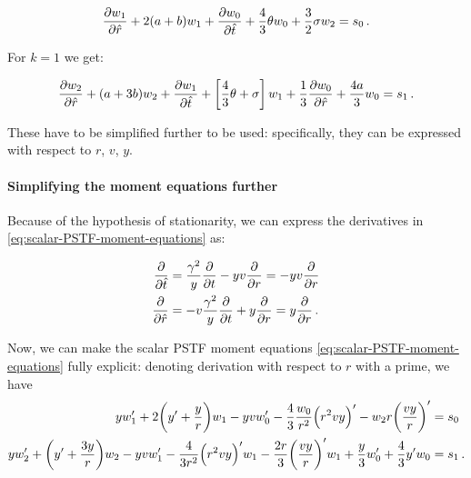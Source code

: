 \documentclass[main.tex]{subfiles}
\begin{document}
\begin{equation}
    \pdv{w_{1}}{\hat{r}} +2( a+ b) w_{1}+\pdv{w_0}{\hat{t}}+\frac{4}{3} \theta w_{0} + \frac{3}{2} \sigma w_{2} = s_0\,.
\end{equation}

For \(k=1\) we get:

\begin{equation}
    \pdv{w_{2}}{\hat{r}} + (a+3 b) w_{2}+\pdv{w_1}{\hat{t}}+\left[\frac{4}{3} \theta+ \sigma\right] w_{1} +\frac{1}{3} \pdv{w_{0}}{\hat{r}}+\frac{4 a}{3} w_{0} = s_1\,.
\end{equation}

These have to be simplified further to be used: specifically, they can be expressed with respect to \(r\), \(v\), \(y\).

\paragraph{Simplifying the moment equations further}


Because of the hypothesis of stationarity, we can express the derivatives in \eqref{eq:scalar-PSTF-moment-equations} as:

\begin{subequations}
\begin{align}
  \pdv{}{\hat{t}} &= \frac{\gamma^2}{y} \pdv{}{t} - yv \pdv{}{r} = - yv \pdv{}{r}  \\
  \pdv{}{\hat{r}} &= -v \frac{\gamma^2}{y} \pdv{}{t} + y \pdv{}{r} = y \pdv{}{r}\,.
\end{align}
\end{subequations}

Now, we can make the scalar PSTF moment equations \eqref{eq:scalar-PSTF-moment-equations} fully explicit: denoting derivation with respect to \(r\) with a prime, we have
\begin{subequations}
\begin{align}
  y w_1^{\prime} + 2 \qty(y^{\prime} + \frac{y}{r}) w_1
  -yv w_0^{\prime}
  - \frac{4}{3} \frac{w_0}{r^2} \qty(r^2 v y)^{\prime}
  - w_2 r \qty(\frac{vy}{r})^{\prime} &= s_0  \\
  y w_2^{\prime} + \qty(y^{\prime} + \frac{3y}{r})w_2
  - yv w_1 ^{\prime} - \frac{4}{3r^2} \qty(r^2 vy)^{\prime} w_1
  - \frac{2r}{3} \qty(\frac{vy}{r})^{\prime} w_1
  + \frac{y}{3} w_0^{\prime} + \frac{4}{3} y^{\prime} w_0
  &= s_1\,.
\end{align}
\end{subequations}
\end{document}
